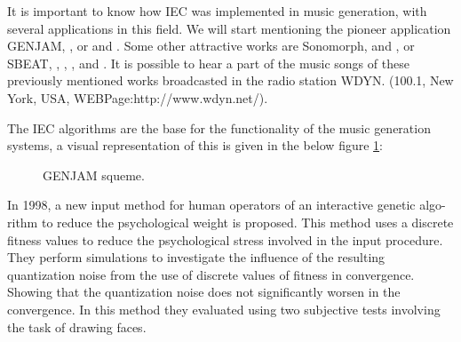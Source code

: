 It is important to know how IEC was implemented in music generation, with
several applications in this field. We will start mentioning the pioneer
application GENJAM, \cite{biles1994genjam},
\cite{biles1996neural} or \cite{biles1999life} and
\cite{biles2002genjam}. Some other attractive works are Sonomorph,
\cite{nelson1993sonomorphs} and \cite{nelson1995further}, or SBEAT, \cite{unemi2003sbeat3},
\cite{horowitz1994generating}, \cite{onisawa2000composition}, \cite{tokui2000music} and
\cite{fels2002interactive}. It is possible to hear a part of the
music songs of these previously mentioned works broadcasted in the radio station
WDYN. (100.1, New York, USA, WEBPage:http://www.wdyn.net/).

The IEC algorithms are the base for the functionality of the music generation
systems, a visual representation of this is given in the below figure \ref{fig:GENJAM}:

\begin{figure}
\captionsetup{justification=centering,margin=2cm}
\centering
\setlength\fboxsep{0pt}
\setlength\fboxrule{0.7pt}
\caption{GENJAM squeme.}
\label{fig:GENJAM}
\end{figure}

In 1998, a new input method for human operators of an interactive genetic algo-
rithm to reduce the psychological weight is proposed. This method uses a
discrete fitness values to reduce the psychological stress involved in the input
procedure. They perform simulations to investigate the influence of the
resulting quantization noise from the use of discrete values of fitness in
convergence. Showing that the quantization noise does not significantly worsen
in the convergence. In this method they evaluated using two subjective tests
involving the task of drawing faces.

